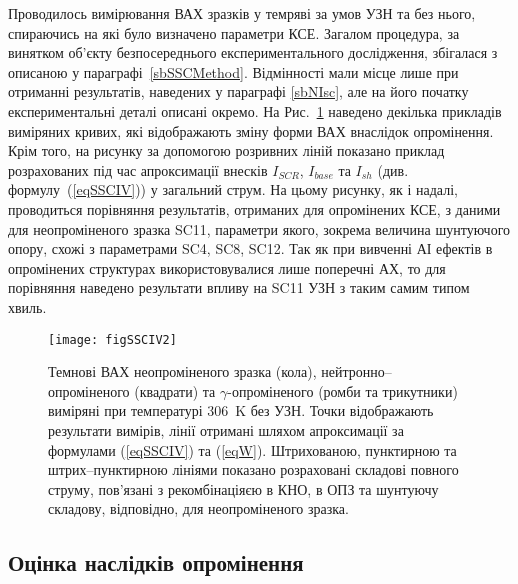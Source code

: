 Проводилось вимірювання ВАХ зразків у темряві за умов УЗН та без нього, спираючись на які було визначено параметри КСЕ.
Загалом процедура, за винятком об'єкту безпосереднього експериментального дослідження,
збігалася з описаною у параграфі~\ref{sbSSCMethod}.
Відмінності мали місце лише при отриманні результатів, наведених у параграфі \ref{sbNIsc},
але на його початку експериментальні деталі описані окремо.
На Рис.~\ref{figSSCIV2} наведено декілька прикладів виміряних кривих, які відображають
зміну форми ВАХ внаслідок опромінення.
Крім того, на рисунку за допомогою розривних ліній показано приклад розрахованих під час апроксимації внесків $I_{SCR}$, $I_{base}$ та $I_{sh}$
(див. формулу~(\ref{eqSSCIV})) у загальний струм.
На цьому рисунку, як і надалі, проводиться порівняння результатів,
отриманих для опромінених КСЕ, з даними для неопроміненого зразка SC11, параметри якого, зокрема величина шунтуючого опору,
схожі з параметрами SC4, SC8, SC12.
Так як при вивченні АІ ефектів в опромінених структурах використовувалися лише поперечні АХ,
то для порівняння наведено результати впливу на SC11 УЗН з таким самим типом хвиль.

\begin{figure}
\center
\texttt{[image: figSSCIV2]}%
\caption{\label{figSSCIV2}
Темнові ВАХ неопроміненого зразка (кола), нейтронно--опроміненого (квадрати) та $\gamma$-опроміненого (ромби та трикутники) виміряні при температурі 306~K без УЗН.
Точки відображають результати вимірів, лінії отримані шляхом апроксимації за формулами (\ref{eqSSCIV}) та (\ref{eqW}).
Штрихованою, пунктирною та штрих--пунктирною лініями показано розраховані складові повного струму, пов'язані з рекомбінаціяєю в КНО, в ОПЗ та шунтуючу складову, відповідно,
для неопроміненого зразка.
}%
\end{figure}



\subsection{Оцінка наслідків опромінення\label{sbRadDefCreate}}

